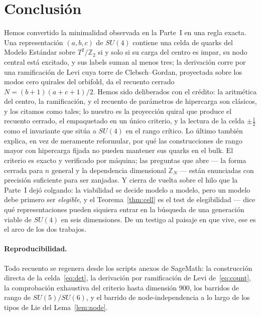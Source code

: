 \documentclass[11pt,a4paper]{article}
\newcommand{\ZZ}{\mathbb{Z}}
\begin{document}
\section{Conclusión}\label{sec:conclusion}
Hemos convertido la minimalidad observada en la Parte~I en una regla exacta. Una representación
$(a,b,c)$ de $SU(4)$ contiene una celda de quarks del Modelo Estándar sobre $T^2/\mathbb{Z}_2$
si y solo si su carga del centro es impar, su nodo central está excitado, y sus labels suman al
menos tres; la derivación corre por una ramificación de Levi cuya torre de Clebsch--Gordan,
proyectada sobre los modos cero quirales del orbifold, da el recuento cerrado
$N=(b+1)(a+c+1)/2$. Hemos sido deliberados con el crédito: la aritmética del centro, la
ramificación, y el recuento de parámetros de hipercarga son clásicos, y los citamos como tales;
lo nuestro es la proyección quiral que produce el recuento cerrado, el empaquetado en un único
criterio, y la lectura de la celda $\pm\tfrac12$ como el invariante que sitúa a $SU(4)$ en el
rango crítico. Lo último también explica, en vez de meramente reformular, por qué las
construcciones de rango mayor con hipercarga fijada no pueden mantener sus quarks en el bulk. El
criterio es exacto y verificado por máquina; las preguntas que abre --- la forma cerrada para
$n$ general y la dependencia dimensional $\ZZ_N$ --- están enunciadas con precisión suficiente
para ser zanjadas. Y cierra de vuelta sobre el hilo que la Parte~I dejó colgando: la viabilidad
se decide modelo a modelo, pero un modelo debe primero ser \emph{elegible}, y el
Teorema~\ref{thm:cell} es el test de elegibilidad --- dice qué representaciones pueden siquiera
entrar en la búsqueda de una generación viable de $SU(4)$ en seis dimensiones. De un testigo al
paisaje en que vive, ese es el arco de los dos trabajos.

\paragraph{Reproducibilidad.} Todo recuento se regenera desde los scripts anexos de SageMath:
la construcción directa de la celda~\eqref{eq:det}, la derivación por ramificación de Levi
de~\eqref{eq:count}, la comprobación exhaustiva del criterio hasta dimensión $900$, los barridos
de rango de $SU(5)/SU(6)$, y el barrido de node-independencia a lo largo de los tipos de Lie del
Lema~\ref{lem:node}.
\end{document}
